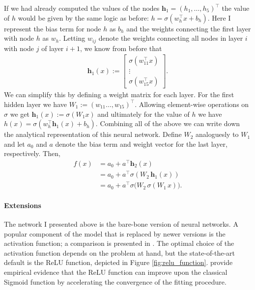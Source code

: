 If we had already computed the values of the nodes $\mathbf{h}_1 = (h_1, \dots,
h_5)^\top$ the value of $h$ would be given by the same logic as before: $h =
\sigma(w_h^\top x + b_h)$. Here I represent the bias term for node $h$ as $b_h$ and the
weights connecting the first layer with node $h$ as $w_h$. Letting $w_{ij}$ denote the
weights connecting all nodes in layer $i$ with node $j$ of layer $i+1$, we know from
before that
\begin{align*}
    \mathbf{h}_1(x) :=
        \begin{bmatrix}
            \sigma(w_{11}^\top x)\\
            \vdots\\
            \sigma(w_{15}^\top x)
        \end{bmatrix}.
\end{align*}
We can simplify this by defining a weight matrix for each layer. For the first hidden
layer we have $W_1 := (w_{11} \dots, w_{15})^\top$. Allowing element-wise operations on
$\sigma$ we get $\mathbf{h}_1(x) := \sigma(W_1 x)$ and ultimately for the value of $h$
we have $h(x) = \sigma(w_h^\top \mathbf{h}_1(x) + b_h)$. Combining all of the above we
can write down the analytical representation of this neural network. Define $W_2$
analoguesly to $W_1$ and let $a_0$ and $a$ denote the bias term and weight vector for
the last layer, respectively. Then,
\begin{align*}
    f(x) &= a_0 + a^\top \mathbf{h}_2(x)\\
         &= a_0 + a^\top \sigma(W_2 \, \mathbf{h}_1(x))\\
         &= a_0 + a^\top \sigma \big( W_2 \, \sigma(W_1 \, x) \big).
\end{align*}


\paragraph{Extensions}

The network I presented above is the bare-bone version of neural networks. A popular
component of the model that is replaced by newer versions is the activation function;
a comparison is presented in \cite{Hara.1994}. The optimal choice of the activation
function depends on the problem at hand, but the state-of-the-art default is the
ReLU function, depicted in Figure \ref{fig:relu_function}. \cite{Hinton.2017} provide
empirical evidence that the ReLU function can improve upon the classical Sigmoid
function by accelerating the convergence of the fitting procedure.


